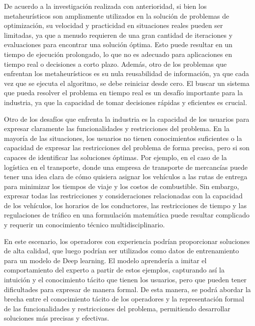 De acuerdo a la investigación realizada con anterioridad, si bien los
metaheurísticos son ampliamente utilizados en la solución de problemas de
optimización, su velocidad y practicidad en situaciones reales pueden ser
limitadas, ya que a menudo requieren de una gran cantidad de iteraciones y
evaluaciones para encontrar una solución óptima. Esto puede resultar en un
tiempo de ejecución prolongado, lo que no es adecuado para aplicaciones en
tiempo real o decisiones a corto plazo. Además, otro de los problemas que
enfrentan los metaheurísticos es su nula reusabilidad de información, ya que
cada vez que se ejecuta el algoritmo, se debe reiniciar desde cero. El buscar
un sistema que pueda resolver el problema en tiempo real es un desafío
importante para la industria, ya que la capacidad de tomar decisiones rápidas y
eficientes es crucial.\medskip

Otro de los desafíos que enfrenta la industria es la capacidad de los usuarios
para expresar claramente las funcionalidades y restricciones del problema. En
la mayoría de las situaciones, los usuarios no tienen conocimientos suficientes
o la capacidad de expresar las restricciones del problema de forma precisa,
pero si son capaces de identificar las soluciones óptimas. Por ejemplo, en el
caso de la logística en el transporte, donde una empresa de transporte de
mercancías puede tener una idea clara de cómo quisiera asignar los vehículos a
las rutas de entrega para minimizar los tiempos de viaje y los costos de
combustible. Sin embargo, expresar todas las restricciones y consideraciones
relacionadas con la capacidad de los vehículos, los horarios de los
conductores, las restricciones de tiempo y las regulaciones de tráfico en una
formulación matemática puede resultar complicado y requerir un conocimiento
técnico multidisciplinario.\medskip

En este escenario, los operadores con experiencia podrían proporcionar
soluciones de alta calidad, que luego podrían ser utilizados como datos de
entrenamiento para un modelo de Deep learning. El modelo aprendería a imitar el
comportamiento del experto a partir de estos ejemplos, capturando así la
intuición y el conocimiento tácito que tienen los usuarios, pero que pueden
tener dificultades para expresar de manera formal. De esta manera, se podrá
abordar la brecha entre el conocimiento tácito de los operadores y la
representación formal de las funcionalidades y restricciones del problema,
permitiendo desarrollar soluciones más precisas y efectivas.\medskip

